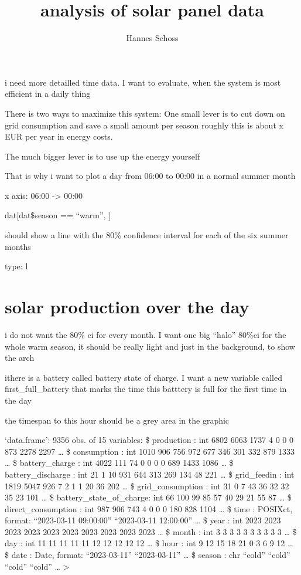 \documentclass[
]{article}
\title{analysis of solar panel data}
\author{Hannes Schoss}
\date{}
\begin{document}
\maketitle

{
\setcounter{tocdepth}{2}
\tableofcontents
}
i need more detailled time data. I want to evaluate, when the system is
most efficient in a daily thing

There is two ways to maximize this system: One small lever is to cut
down on grid consumption and save a small amount per season roughly this
is about x EUR per year in energy costs.

The much bigger lever is to use up the energy yourself

That is why i want to plot a day from 06:00 to 00:00 in a normal summer
month

x axis: 06:00 -\textgreater{} 00:00

dat{[}dat\$season == ``warm'', {]}

should show a line with the 80\% confidence interval for each of the six
summer months

type: l

\section{solar production over the
day}\label{solar-production-over-the-day}

i do not want the 80\% ci for every month. I want one big ``halo''
80\%ci for the whole warm season, it should be really light and just in
the background, to show the arch

ithere is a battery called battery state of charge. I want a new
variable called first\_full\_battery that marks the time this batttery
is full for the first time in the day

the timespan to this hour should be a grey area in the graphic

`data.frame': 9356 obs. of 15 variables: \$ production : int 6802 6063
1737 4 0 0 0 873 2278 2297 \ldots{} \$ consumption : int 1010 906 756
972 677 346 301 332 879 1333 \ldots{} \$ battery\_charge : int 4022 111
74 0 0 0 0 689 1433 1086 \ldots{} \$ battery\_discharge : int 21 1 10
931 644 313 269 134 48 221 \ldots{} \$ grid\_feedin : int 1819 5047 926
7 2 1 1 20 36 202 \ldots{} \$ grid\_consumption : int 31 0 7 43 36 32 32
35 23 101 \ldots{} \$ battery\_state\_of\_charge: int 66 100 99 85 57 40
29 21 55 87 \ldots{} \$ direct\_consumption : int 987 906 743 4 0 0 0
180 828 1104 \ldots{} \$ time : POSIXct, format: ``2023-03-11 09:00:00''
``2023-03-11 12:00:00'' \ldots{} \$ year : int 2023 2023 2023 2023 2023
2023 2023 2023 2023 2023 \ldots{} \$ month : int 3 3 3 3 3 3 3 3 3 3
\ldots{} \$ day : int 11 11 11 11 11 12 12 12 12 12 \ldots{} \$ hour :
int 9 12 15 18 21 0 3 6 9 12 \ldots{} \$ date : Date, format:
``2023-03-11'' ``2023-03-11'' \ldots{} \$ season : chr ``cold'' ``cold''
``cold'' ``cold'' \ldots{} \textgreater{}
\end{document}
